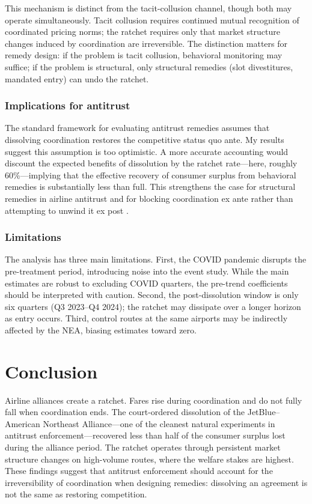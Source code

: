 \documentclass[12pt]{article}
\begin{document}
This mechanism is distinct from the \citet{ciliberto2014} tacit-collusion channel, though both may operate simultaneously. Tacit collusion requires continued mutual recognition of coordinated pricing norms; the ratchet requires only that market structure changes induced by coordination are irreversible. The distinction matters for remedy design: if the problem is tacit collusion, behavioral monitoring may suffice; if the problem is structural, only structural remedies (slot divestitures, mandated entry) can undo the ratchet.

\subsubsection*{Implications for antitrust} The standard framework for evaluating antitrust remedies assumes that dissolving coordination restores the competitive status quo ante. My results suggest this assumption is too optimistic. A more accurate accounting would discount the expected benefits of dissolution by the ratchet rate---here, roughly 60\%---implying that the effective recovery of consumer surplus from behavioral remedies is substantially less than full. This strengthens the case for structural remedies in airline antitrust \citep{kwoka2013,kwoka2015} and for blocking coordination ex ante rather than attempting to unwind it ex post \citep{carlton2019,nocke2022}.

\subsubsection*{Limitations} The analysis has three main limitations. First, the COVID pandemic disrupts the pre-treatment period, introducing noise into the event study. While the main estimates are robust to excluding COVID quarters, the pre-trend coefficients should be interpreted with caution. Second, the post-dissolution window is only six quarters (Q3 2023--Q4 2024); the ratchet may dissipate over a longer horizon as entry occurs. Third, control routes at the same airports may be indirectly affected by the NEA, biasing estimates toward zero.


\section{Conclusion}

Airline alliances create a ratchet. Fares rise during coordination and do not fully fall when coordination ends. The court-ordered dissolution of the JetBlue--American Northeast Alliance---one of the cleanest natural experiments in antitrust enforcement---recovered less than half of the consumer surplus lost during the alliance period. The ratchet operates through persistent market structure changes on high-volume routes, where the welfare stakes are highest. These findings suggest that antitrust enforcement should account for the irreversibility of coordination when designing remedies: dissolving an agreement is not the same as restoring competition.
\end{document}
